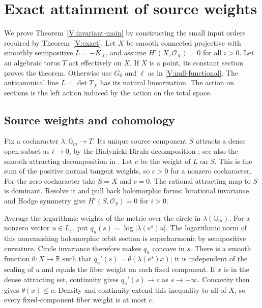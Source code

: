 \section{Exact attainment of source weights}
\label{subsec:valuation-extremal-weights}

We prove Theorem~\ref{V:invariant-main} by constructing the small input
orders required by Theorem~\ref{V:exact}. Let $X$ be smooth connected
projective with smoothly semipositive $L=-K_X$, and assume
$H^i(X,\mathcal O_X)=0$ for all $i>0$. Let an algebraic torus $T$
act effectively on $X$. If $X$ is a point, its constant section proves
the theorem. Otherwise use $G_0$ and $\ell$ as in
\eqref{V:null-functional}. The anticanonical line $L=\det T_X$ has its
natural linearization.  The action on sections is the left action
induced by the action on the total space.

\subsection{Source weights and cohomology}

Fix a cocharacter $\lambda:\mathbb G_m\to T$.  Its unique source
component $S$ attracts a dense open subset as $t\to0$, by the
Bia\l ynicki-Birula decomposition \cite{BB1973}; see also the smooth attracting decomposition in \cite[Theorem~1.5 and Corollary~7.3]{JelisiejewSienkiewicz2019}.  Let $c$ be
the weight of $L$ on $S$.  This is the sum of the positive normal
tangent weights, so $c>0$ for a nonzero cocharacter.  For the zero
cocharacter take $S=X$ and $c=0$.  The rational attracting map to $S$
is dominant.  Resolve it and pull back holomorphic forms; birational
invariance and Hodge symmetry give
$H^i(S,\mathcal O_S)=0$ for $i>0$.

Average the logarithmic weights of the metric over the circle in
$\lambda(\mathbb G_m)$.  For a nonzero vector $u\in L_x$, put
$q_u(s)=\log|\lambda(e^s)u|$.  The logarithmic norm of this
nonvanishing holomorphic orbit section is superharmonic by semipositive
curvature.  Circle invariance therefore makes $q_u$ concave in $s$.
There is a smooth function $\theta:X\to\mathbb R$ such that
$q_u'(s)=\theta(\lambda(e^s)x)$; it is independent of the scaling
of $u$ and equals the fiber weight on each fixed component.  If $x$
is in the dense attracting set, continuity gives
$q_u'(s)\to c$ as $s\to-\infty$.  Concavity then gives
$\theta(x)\le c$.  Density and continuity extend this inequality
to all of $X$, so every fixed-component fiber weight is at most $c$.

